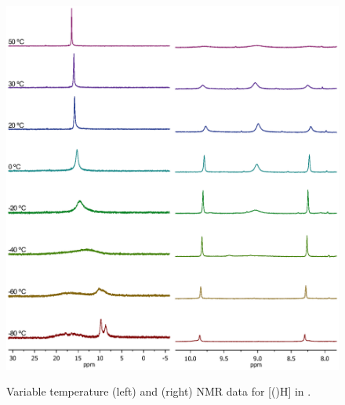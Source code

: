 \begin{figure}[h!]
\begin{center}
\vspace{0.5cm}
\includegraphics[scale=0.8, trim = 0cm 6.8cm 0cm 2cm]{../NMR/PhosphoniumVTNMRboth.eps}
\caption[VT-NMR for {[}(\tButhixantphos)H\ce{]+}]{Variable temperature \phosphorus{} (left) and \proton{} (right) NMR data for [(\tButhixantphos)H] in .}
\vspace{0.2cm}
\label{VTStBuH}
\end{center}
\end{figure}
\vspace{0.2cm}



